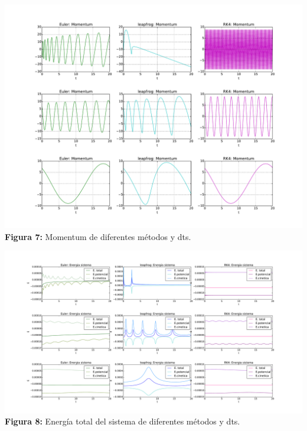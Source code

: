 \documentclass[11pt,letterpaper]{exam}
\begin{document}
\begin{center}
\includegraphics[width=16.cm]{Mome_met_dt.pdf}
\textbf{Figura 7:}{  Momentum de diferentes m\'etodos y dts.}
\end{center}

\begin{center}
\includegraphics[width=16.cm]{Ener_met_dt.pdf}
\textbf{Figura 8:}{  Energ\'ia total del sistema de diferentes m\'etodos y dts.}
\end{center}
\end{document}
